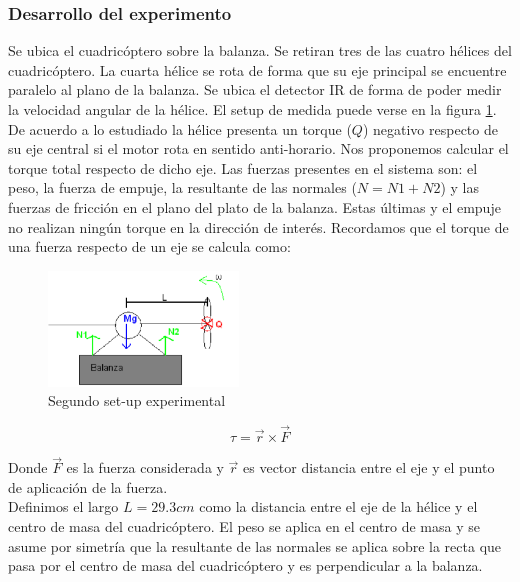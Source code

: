 \documentclass[main]{subfiles}
\begin{document}
\subsubsection*{Desarrollo del experimento}
\label{sub:torque}
Se ubica el cuadric\'optero sobre la balanza. Se retiran tres de las cuatro h\'elices del cuadric\'optero. La cuarta h\'elice se rota de forma que su eje principal se encuentre paralelo al plano de la balanza. Se ubica el detector IR de forma de poder medir la velocidad angular de la h\'elice. El setup de medida puede verse en la figura \ref{fig:setup2}. De acuerdo a lo estudiado la h\'elice presenta un torque ($Q$) negativo respecto de su eje central si el motor rota en sentido anti-horario. Nos proponemos calcular el torque total respecto de dicho eje. Las fuerzas presentes en el sistema son: el peso, la fuerza de empuje, la resultante de las normales ($N = N1+N2$) y las fuerzas de fricci\'on en el plano del plato de la balanza. Estas \'ultimas y el empuje no realizan ning\'un torque en la direcci\'on de inter\'es. Recordamos que el torque de una fuerza respecto de un eje se calcula como:
\begin{figure}
  \vspace{0pt}
  \begin{center}
    \includegraphics[width=0.45\textwidth]{./pics_motores/set2.pdf}
  \end{center}
  \vspace{-15pt}
  \caption{Segundo set-up experimental}
  \label{fig:setup2}
  \vspace{10pt}
\end{figure}
\begin{equation}
\tau=\vec{r} \times \vec{F} 
\end{equation}

Donde $\vec{F}$ es la fuerza considerada y $\vec{r}$ es vector distancia entre el eje y el punto de aplicaci\'on de la fuerza.\\

Definimos el largo $L=29.3cm$ como la distancia entre el eje de la h\'elice y el centro de masa del cuadric\'optero. El peso se aplica en el centro de masa y se asume por simetr\'ia que la resultante de las normales se aplica sobre la recta que pasa por el centro de masa del cuadric\'optero y es perpendicular a la balanza. 
\end{document}
